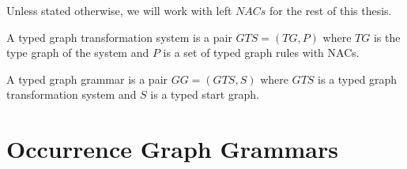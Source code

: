 \begin{assumption} Unless stated otherwise, we will work with left $NACs$ for the rest of this thesis.
\end{assumption}

\begin{remark}
\end{remark}

\begin{definition}  A typed graph transformation system is a pair $GTS = (TG,P)$ where $TG$ is the type graph of the system and $P$ is a set of typed graph rules with NACs.

  A typed graph grammar is a pair $GG = (GTS,S)$ where $GTS$ is a typed graph transformation system and $S$ is a typed start graph.
\end{definition}

\begin{definition}
\end{definition}


\section{Occurrence Graph Grammars}

\begin{definition}
\end{definition}

\begin{definition}
\end{definition}

\begin{definition}
\end{definition}

\begin{definition}
\end{definition}
